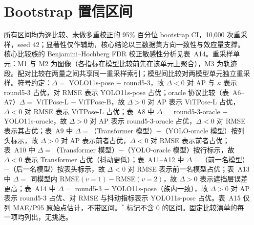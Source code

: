 \documentclass[10pt,conference]{IEEEtran}
\begin{document}

\appendices
\renewcommand{\thetable}{A\arabic{table}}
\setcounter{table}{0}
\section{Bootstrap 置信区间}

所有区间均为逐比较、未做多重校正的 95\% 百分位 bootstrap CI，10,000 次重采样，seed 42；显著性仅作辅助，核心结论以三数据集方向一致性与效应量支撑。核心比较族的 Benjamini--Hochberg FDR 校正敏感性分析见表~A14。重采样单元：M1 与 M2 为图像（各指标在模型比较前先在该单元上聚合），M3 为轨迹段。配对比较在两量之间共享同一重采样索引；模型间比较对两模型单元独立重采样。符号约定：$\Delta=$ YOLO11s-pose $-$ round5-3，故 $\Delta<0$ 对 AP 与 $\kappa$ 表示 round5-3 占优，对 RMSE 表示 YOLO11s-pose 占优；oracle 协议比较（表~A6--A7）$\Delta=$ ViTPose-L $-$ ViTPose-B，故 $\Delta>0$ 对 AP 表示 ViTPose-L 占优，$\Delta<0$ 对 RMSE 表示 ViTPose-L 占优；表~A8 中 $\Delta=$ round5-3-oracle $-$ YOLO11s-oracle，故 $\Delta>0$ 对 AP 表示 round5-3-oracle 占优，$\Delta<0$ 对 RMSE 表示其占优；表~A9 中 $\Delta=$（Transformer 模型）$-$（YOLO-oracle 模型）按列头标示，故 $\Delta>0$ 对 AP 表示前者占优，$\Delta<0$ 对 RMSE 表示前者占优；表~A10 中 $\Delta=$（Transformer 模型）$-$（YOLO-oracle 模型）按行标示，故 $\Delta<0$ 表示 Transformer 占优（抖动更低）；表~A11--A12 中 $\Delta=$（前一名模型）$-$（后一名模型）按表头标示，故 $\Delta<0$ 对 RMSE 表示前一名模型占优；表~A13 中 $\Delta=$ 同模型内 RMSE$(v{=}1)-$RMSE$(v{=}2)$，故 $\Delta>0$ 表示遮挡层误差更高；表~A14 中 $\Delta=$ round5-3 $-$ YOLO11s-pose（族内一致），故 $\Delta>0$ 对 AP 表示 round5-3 占优、对 RMSE 与抖动指标表示 YOLO11s-pose 占优。表~A15 仅列 MAE/P95 原始点估计，不带区间。$^{*}$ 标记不含 0 的区间。固定比较清单的每一项均列出，无挑选。


\end{document}
